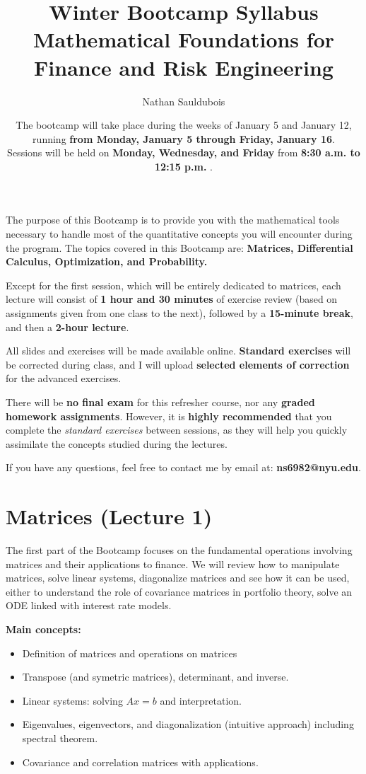 \documentclass[12pt,a4paper]{article}
\title{\textbf{Winter Bootcamp Syllabus}\\[0.5em]
\large Mathematical Foundations for Finance and Risk Engineering}
\author{Nathan Sauldubois}
\date{The bootcamp will take place during the weeks of January 5 and January 12, running \textbf{from Monday, January 5 through Friday, January 16}.
\\
Sessions will be held on \textbf{Monday, Wednesday, and Friday} from \textbf{8:30 a.m. to 12:15 p.m.} .}
\begin{document}
\maketitle


The purpose of this Bootcamp is to provide you with the mathematical tools necessary to handle most of the quantitative concepts you will encounter during the program. 
The topics covered in this Bootcamp are: \textbf{Matrices, Differential Calculus, Optimization, and Probability.}


Except for the first session, which will be entirely dedicated to matrices, each lecture will consist of \textbf{1 hour and 30 minutes} of exercise review (based on assignments given from one class to the next), followed by a \textbf{15-minute break}, and then a \textbf{2-hour lecture}. 

All slides and exercises will be made available online. 
\textbf{Standard exercises} will be corrected during class, 
and I will upload \textbf{selected elements of correction} for the advanced exercises.

There will be \textbf{no final exam} for this refresher course, nor any \textbf{graded homework assignments}. 
However, it is \textbf{highly recommended} that you complete the \emph{standard exercises} between sessions, 
as they will help you quickly assimilate the concepts studied during the lectures.

\medskip 
If you have any questions, feel free to contact me by email at: \textbf{ns6982@nyu.edu}.
\medskip 



\section{Matrices (Lecture 1)}
The first part of the Bootcamp focuses on the fundamental operations involving matrices and their applications to finance. 
We will review how to manipulate matrices, solve linear systems, diagonalize matrices and see how it can be used, either to understand the role of covariance matrices in portfolio theory, solve an ODE linked with interest rate models.

\medskip 

\textbf{Main concepts:}
\begin{itemize}[itemsep=-4pt, topsep=2pt]
    \item Definition of matrices and operations on matrices
    \item Transpose (and symetric matrices), determinant, and inverse.
    \item Linear systems: solving $A x = b$ and interpretation.
    \item Eigenvalues, eigenvectors, and diagonalization (intuitive approach) including spectral theorem.
    \item Covariance and correlation matrices with applications.
\end{itemize}
\end{document}
